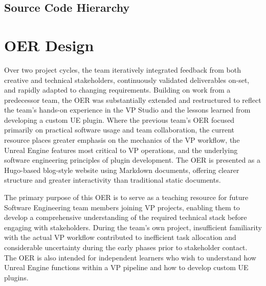 \documentclass[12pt,a4paper]{report}
\begin{document}
\subsection{Source Code Hierarchy}

\section{OER Design}

Over two project cycles, the team iteratively integrated feedback from both creative and technical stakeholders, continuously validated deliverables on-set, and rapidly adapted to changing requirements. Building on work from a predecessor team, the OER was substantially extended and restructured to reflect the team's hands-on experience in the VP Studio and the lessons learned from developing a custom UE plugin. Where the previous team's OER focused primarily on practical software usage and team collaboration, the current resource places greater emphasis on the mechanics of the VP workflow, the Unreal Engine features most critical to VP operations, and the underlying software engineering principles of plugin development. The OER is presented as a Hugo-based blog-style website using Markdown documents, offering clearer structure and greater interactivity than traditional static documents.

The primary purpose of this OER is to serve as a teaching resource for future Software Engineering team members joining VP projects, enabling them to develop a comprehensive understanding of the required technical stack before engaging with stakeholders. During the team's own project, insufficient familiarity with the actual VP workflow contributed to inefficient task allocation and considerable uncertainty during the early phases prior to stakeholder contact. The OER is also intended for independent learners who wish to understand how Unreal Engine functions within a VP pipeline and how to develop custom UE plugins.
\end{document}
